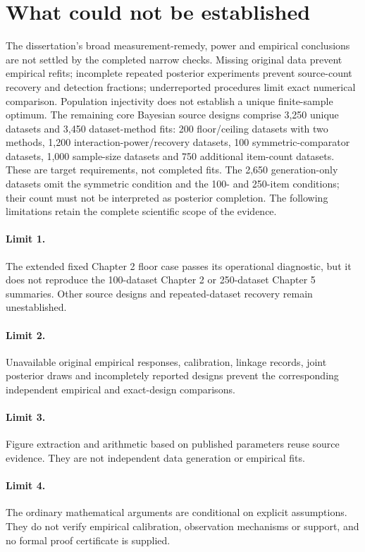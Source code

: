 \documentclass[11pt]{article}
\begin{document}
\section{What could not be established}
The dissertation's broad measurement-remedy, power and empirical conclusions are not settled by the completed narrow checks. Missing original data prevent empirical refits; incomplete repeated posterior experiments prevent source-count recovery and detection fractions; underreported procedures limit exact numerical comparison. Population injectivity does not establish a unique finite-sample optimum. The remaining core Bayesian source designs comprise 3,250 unique datasets and 3,450 dataset-method fits: 200 floor/ceiling datasets with two methods, 1,200 interaction-power/recovery datasets, 100 symmetric-comparator datasets, 1,000 sample-size datasets and 750 additional item-count datasets. These are target requirements, not completed fits. The 2,650 generation-only datasets omit the symmetric condition and the 100- and 250-item conditions; their count must not be interpreted as posterior completion. The following limitations retain the complete scientific scope of the evidence.
\paragraph{Limit 1.} The extended fixed Chapter 2 floor case passes its operational diagnostic, but it does not reproduce the 100-dataset Chapter 2 or 250-dataset Chapter 5 summaries. Other source designs and repeated-dataset recovery remain unestablished.
\paragraph{Limit 2.} Unavailable original empirical responses, calibration, linkage records, joint posterior draws and incompletely reported designs prevent the corresponding independent empirical and exact-design comparisons.
\paragraph{Limit 3.} Figure extraction and arithmetic based on published parameters reuse source evidence. They are not independent data generation or empirical fits.
\paragraph{Limit 4.} The ordinary mathematical arguments are conditional on explicit assumptions. They do not verify empirical calibration, observation mechanisms or support, and no formal proof certificate is supplied.
\end{document}
